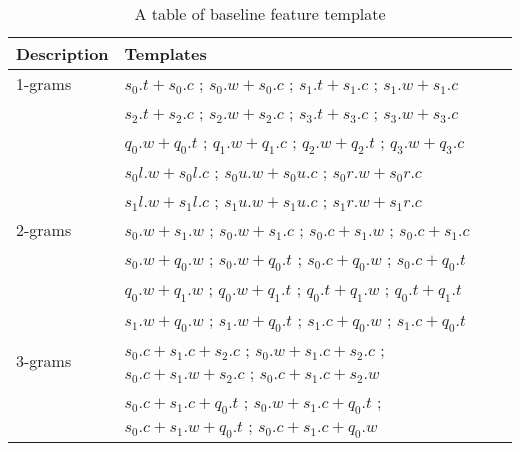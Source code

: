 \begin{table*}[t]
	\caption{\label{baseline feat} A table of baseline feature template}
	\begin{center}
		\begin{tabular}{|l|l|}
			\hline 
			Description & Templates  \\ 
			\hline
			1-grams 	& $s_0.t+s_0.c$   ;   $s_0.w+s_0.c$ ; $s_1.t+s_1.c$   ;   $s_1.w+s_1.c$ \\
			& $s_2.t+s_2.c$   ;   $s_2.w+s_2.c$   ;   $s_3.t+s_3.c$   ;   $s_3.w+s_3.c$ \\
			& $q_0.w+q_0.t$   ;   $q_1.w+q_1.c$   ;   $q_2.w+q_2.t$   ;   $q_3.w+q_3.c$ \\
			
			& $s_0l.w+s_0l.c$   ;   $s_0u.w+s_0u.c$   ;   $s_0r.w+s_0r.c$ \\
			& $s_1l.w+s_1l.c$   ;   $s_1u.w+s_1u.c$   ;   $s_1r.w+s_1r.c$ \\
			\hline
			2-grams 	& $s_0.w+s_1.w$   ;   $s_0.w+s_1.c$   ;   $s_0.c+s_1.w$   ;   $s_0.c+s_1.c$ \\
			& $s_0.w+q_0.w$   ;   $s_0.w+q_0.t$   ;   $s_0.c+q_0.w$   ;   $s_0.c+q_0.t$ \\
			& $q_0.w+q_1.w$   ;   $q_0.w+q_1.t$   ;   $q_0.t+q_1.w$   ;   $q_0.t+q_1.t$ \\
			& $s_1.w+q_0.w$   ;   $s_1.w+q_0.t$   ;   $s_1.c+q_0.w$   ;   $s_1.c+q_0.t$ \\
			\hline
			3-grams 	& $s_0.c+s_1.c+s_2.c$   ;   $s_0.w+s_1.c+s_2.c$ ; $s_0.c+s_1.w+s_2.c$   ;   $s_0.c+s_1.c+s_2.w$ \\
			& $s_0.c+s_1.c+q_0.t$   ;   $s_0.w+s_1.c+q_0.t$   ;   $s_0.c+s_1.w+q_0.t$   ;   $s_0.c+s_1.c+q_0.w$ \\
			\hline
		\end{tabular}
	\end{center}
\end{table*}